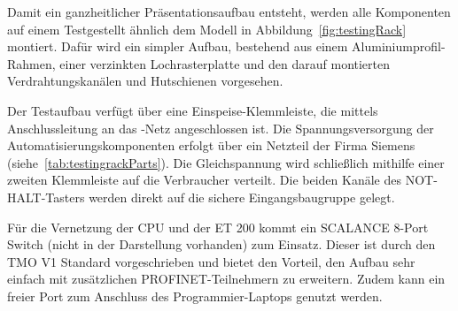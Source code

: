 \nopagebreak



Damit ein ganzheitlicher Präsentationsaufbau entsteht, werden alle Komponenten auf einem Testgestellt ähnlich dem Modell in Abbildung~\ref{fig:testingRack} montiert. Dafür wird ein simpler Aufbau, bestehend aus einem Aluminiumprofil-Rahmen, einer verzinkten Lochrasterplatte und den darauf montierten Verdrahtungskanälen und Hutschienen vorgesehen. 

Der Testaufbau verfügt über eine Einspeise-Klemmleiste, die mittels Anschlussleitung an das -Netz angeschlossen ist. Die Spannungsversorgung der Automatisierungskomponenten erfolgt über ein Netzteil der Firma Siemens (siehe~\ref{tab:testingrackParts}). Die  Gleichspannung wird schließlich mithilfe einer zweiten Klemmleiste auf die Verbraucher verteilt. Die beiden Kanäle des NOT-HALT-Tasters werden direkt auf die sichere Eingangsbaugruppe gelegt.


Für die Vernetzung der CPU und der ET 200 kommt ein SCALANCE 8-Port Switch (nicht in der Darstellung vorhanden) zum Einsatz. Dieser ist durch den TMO V1 Standard vorgeschrieben und bietet den Vorteil, den Aufbau sehr einfach mit zusätzlichen PROFINET-Teilnehmern zu erweitern. Zudem kann ein freier Port zum Anschluss des Programmier-Laptops genutzt werden.




